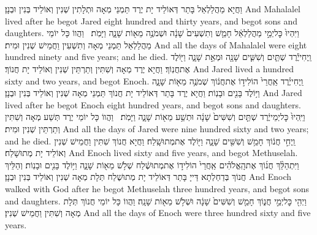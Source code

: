 {וַחֲיָא מַהֲלַלְאֵל בָּתַר דְּאוֹלֵיד יָת יֶרֶד תַּמְנֵי מְאָה וּתְלָתִין שְׁנִין וְאוֹלֵיד בְּנִין וּבְנָן׃}
{And Mahalalel lived after he begot Jared eight hundred and thirty years, and begot sons and daughters.}{}
{וַיִּהְיוּ֙ כׇּל\maqqaf יְמֵ֣י מַהֲלַלְאֵ֔ל חָמֵ֤שׁ וְתִשְׁעִים֙ שָׁנָ֔ה וּשְׁמֹנֶ֥ה מֵא֖וֹת שָׁנָ֑ה וַיָּמֹֽת׃ \setuma }
{וַהֲווֹ כָּל יוֹמֵי מַהֲלַלְאֵל תַּמְנֵי מְאָה וְתִשְׁעִין וַחֲמֵישׁ שְׁנִין וּמִית׃}
{And all the days of Mahalalel were eight hundred ninety and five years; and he died.}{}
{וַֽיְחִי\maqqaf יֶ֕רֶד שְׁתַּ֧יִם וְשִׁשִּׁ֛ים שָׁנָ֖ה וּמְאַ֣ת שָׁנָ֑ה וַיּ֖וֹלֶד אֶת\maqqaf חֲנֽוֹךְ׃}
{וַחֲיָא יֶרֶד מְאָה וְשִׁתִּין וְתַרְתֵּין שְׁנִין וְאוֹלֵיד יָת חֲנוֹךְ׃}
{And Jared lived a hundred sixty and two years, and begot Enoch.}{}
{וַֽיְחִי\maqqaf יֶ֗רֶד אַֽחֲרֵי֙ הוֹלִיד֣וֹ אֶת\maqqaf חֲנ֔וֹךְ שְׁמֹנֶ֥ה מֵא֖וֹת שָׁנָ֑ה וַיּ֥וֹלֶד בָּנִ֖ים וּבָנֽוֹת׃}
{וַחֲיָא יֶרֶד בָּתַר דְּאוֹלֵיד יָת חֲנוֹךְ תַּמְנֵי מְאָה שְׁנִין וְאוֹלֵיד בְּנִין וּבְנָן׃}
{And Jared lived after he begot Enoch eight hundred years, and begot sons and daughters.}{}
{וַיִּֽהְיוּ֙ כׇּל\maqqaf יְמֵי\maqqaf יֶ֔רֶד שְׁתַּ֤יִם וְשִׁשִּׁים֙ שָׁנָ֔ה וּתְשַׁ֥ע מֵא֖וֹת שָׁנָ֑ה וַיָּמֹֽת׃ \setuma }
{וַהֲווֹ כָּל יוֹמֵי יֶרֶד תְּשַׁע מְאָה וְשִׁתִּין וְתַרְתֵּין שְׁנִין וּמִית׃}
{And all the days of Jared were nine hundred sixty and two years; and he died.}{}
{וַֽיְחִ֣י חֲנ֔וֹךְ חָמֵ֥שׁ וְשִׁשִּׁ֖ים שָׁנָ֑ה וַיּ֖וֹלֶד אֶת\maqqaf מְתוּשָֽׁלַח׃}
{וַחֲיָא חֲנוֹךְ שִׁתִּין וַחֲמֵישׁ שְׁנִין וְאוֹלֵיד יָת מְתוּשָׁלַח׃}
{And Enoch lived sixty and five years, and begot Methuselah.}{}
{וַיִּתְהַלֵּ֨ךְ חֲנ֜וֹךְ אֶת\maqqaf הָֽאֱלֹהִ֗ים אַֽחֲרֵי֙ הוֹלִיד֣וֹ אֶת\maqqaf מְתוּשֶׁ֔לַח שְׁלֹ֥שׁ מֵא֖וֹת שָׁנָ֑ה וַיּ֥וֹלֶד בָּנִ֖ים וּבָנֽוֹת׃}
{וְהַלֵּיךְ חֲנוֹךְ בְּדַחְלְתָא דַּייָ בָּתַר דְּאוֹלֵיד יָת מְתוּשֶׁלַח תְּלָת מְאָה שְׁנִין וְאוֹלֵיד בְּנִין וּבְנָן׃}
{And Enoch walked with God after he begot Methuselah three hundred years, and begot sons and daughters.}{}
{וַיְהִ֖י כׇּל\maqqaf יְמֵ֣י חֲנ֑וֹךְ חָמֵ֤שׁ וְשִׁשִּׁים֙ שָׁנָ֔ה וּשְׁלֹ֥שׁ מֵא֖וֹת שָׁנָֽה׃}
{וַהֲווֹ כָּל יוֹמֵי חֲנוֹךְ תְּלָת מְאָה וְשִׁתִּין וַחֲמֵישׁ שְׁנִין׃}
{And all the days of Enoch were three hundred sixty and five years.}{}
